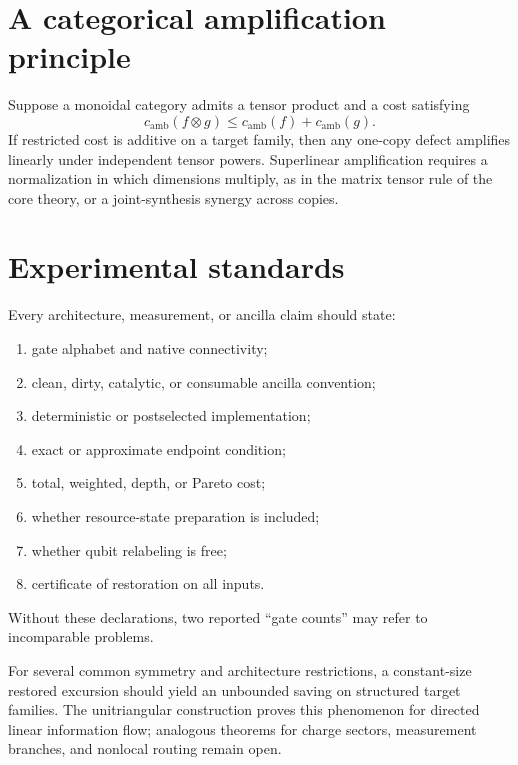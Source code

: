 \section{A categorical amplification principle}
Suppose a monoidal category admits a tensor product and a cost satisfying
\[
c_{\mathrm{amb}}(f\otimes g)
\le
c_{\mathrm{amb}}(f)+c_{\mathrm{amb}}(g).
\]
If restricted cost is additive on a target family, then any one-copy defect amplifies linearly under independent tensor powers.  Superlinear amplification requires a normalization in which dimensions multiply, as in the matrix tensor rule of the core theory, or a joint-synthesis synergy across copies.

\section{Experimental standards}
Every architecture, measurement, or ancilla claim should state:
\begin{enumerate}
\item gate alphabet and native connectivity;
\item clean, dirty, catalytic, or consumable ancilla convention;
\item deterministic or postselected implementation;
\item exact or approximate endpoint condition;
\item total, weighted, depth, or Pareto cost;
\item whether resource-state preparation is included;
\item whether qubit relabeling is free;
\item certificate of restoration on all inputs.
\end{enumerate}
Without these declarations, two reported ``gate counts'' may refer to incomparable problems.

\begin{conjecturebox}
For several common symmetry and architecture restrictions, a constant-size restored excursion should yield an unbounded saving on structured target families.  The unitriangular construction proves this phenomenon for directed linear information flow; analogous theorems for charge sectors, measurement branches, and nonlocal routing remain open.
\end{conjecturebox}
